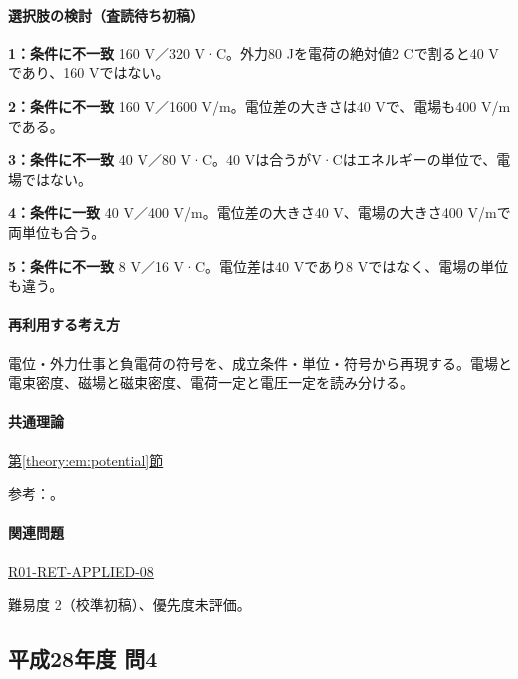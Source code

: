 \paragraph{選択肢の検討（査読待ち初稿）}\mbox{}\par

\noindent\textbf{1：条件に不一致} 160 V／320 V·C。外力80 Jを電荷の絶対値2 Cで割ると40 Vであり、160 Vではない。\par

\noindent\textbf{2：条件に不一致} 160 V／1600 V/m。電位差の大きさは40 Vで、電場も400 V/mである。\par

\noindent\textbf{3：条件に不一致} 40 V／80 V·C。40 Vは合うがV·Cはエネルギーの単位で、電場ではない。\par

\noindent\textbf{4：条件に一致} 40 V／400 V/m。電位差の大きさ40 V、電場の大きさ400 V/mで両単位も合う。\par

\noindent\textbf{5：条件に不一致} 8 V／16 V·C。電位差は40 Vであり8 Vではなく、電場の単位も違う。\par

\paragraph{再利用する考え方} 電位・外力仕事と負電荷の符号を、成立条件・単位・符号から再現する。電場と電束密度、磁場と磁束密度、電荷一定と電圧一定を読み分ける。

\paragraph{共通理論} \hyperref[theory:em:potential]{第\ref*{theory:em:potential}節}

\par 参考：\cite{mit_em03}。

\paragraph{関連問題} \hyperref[q:r01-ret-applied-08]{R01-RET-APPLIED-08}

\par 難易度 2（校準初稿）、優先度未評価。

\subsection{平成28年度 問4}
\label{q:h28-reg-applied-04}

